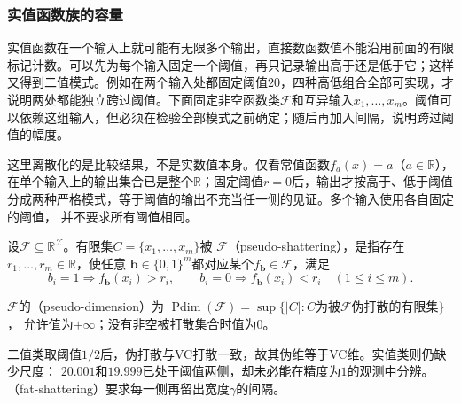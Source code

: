 \subsubsection{实值函数族的容量}
\label{sec:comb-real-valued-threshold-margins}

实值函数在一个输入上就可能有无限多个输出，直接数函数值不能沿用前面的有限标记计数。可以先为每个输入固定一个阈值，再只记录输出高于还是低于它；这样又得到二值模式。例如在两个输入处都固定阈值$20$，四种高低组合全部可实现，才说明两处都能独立跨过阈值。下面固定非空函数类$\mathcal F$和互异输入$x_1,\ldots,x_m$。阈值可以依赖这组输入，但必须在检验全部模式之前确定；随后再加入间隔，说明跨过阈值的幅度。

这里离散化的是比较结果，不是实数值本身。仅看常值函数$f_a(x)=a$（$a\in\mathbb R$），
在单个输入上的输出集合已是整个$\mathbb R$；固定阈值$r=0$后，输出才按高于、低于阈值
分成两种严格模式，等于阈值的输出不充当任一侧的见证。多个输入使用各自固定的阈值，
并不要求所有阈值相同。

\begin{definition}[伪打散]
\label{def:pseudo-shattering}
设$\mathcal F\subseteq\mathbb R^{\mathcal X}$。有限集$C=\{x_1,\ldots,x_m\}$被
$\mathcal F$（pseudo-shattering），是指存在$r_1,\ldots,r_m\in\mathbb R$，使任意
$\bm b\in\{0,1\}^m$都对应某个$f_{\bm b}\in\mathcal F$，满足
\[
 b_i=1\Rightarrow f_{\bm b}(x_i)>r_i,\qquad
 b_i=0\Rightarrow f_{\bm b}(x_i)<r_i\quad(1\leq i\leq m).
\]
\end{definition}
\begin{definition}[伪维]
\label{def:pseudo-dimension}
$\mathcal F$的（pseudo-dimension）为
$\operatorname{Pdim}(\mathcal F)=\sup\{|C|:C\text{为被}\mathcal F\text{伪打散的有限集}\}$，
允许值为$+\infty$；没有非空被打散集合时值为$0$。
\end{definition}

二值类取阈值$1/2$后，伪打散与VC打散一致，故其伪维等于VC维。实值类则仍缺少尺度：
$20.001$和$19.999$已处于阈值两侧，却未必能在精度为$1$的观测中分辨。
（fat-shattering）要求每一侧再留出宽度$\gamma$的间隔。

